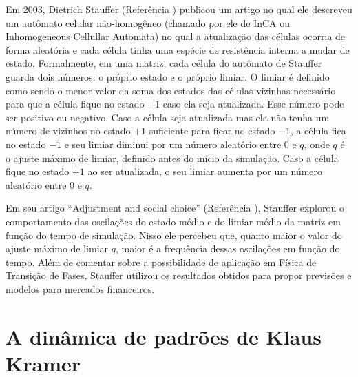 \documentclass[
	12pt,				%
	openright,			%
	twoside,			%
	a4paper,			%
	english,			%
	french,				%
	spanish,			%
	brazil				%
	]{abntex2}
\begin{document}
Em 2003, Dietrich Stauffer (Referência \cite{stauffer}) publicou um artigo no qual ele descreveu um autômato celular não-homogêneo (chamado por ele de InCA ou Inhomogeneous Cellullar Automata) no qual a atualização das células ocorria de forma aleatória e cada célula tinha uma espécie de resistência interna a mudar de estado. Formalmente, em uma matriz, cada célula do autômato de Stauffer guarda dois números: o próprio estado e o próprio limiar. O limiar é definido como sendo o menor valor da soma dos estados das células vizinhas necessário para que a célula fique no estado $+1$ caso ela seja atualizada. Esse número pode ser positivo ou negativo. Caso a célula seja atualizada mas ela não tenha um número de vizinhos no estado $+1$ suficiente para ficar no estado $+1$, a célula fica no estado $-1$ e seu limiar diminui por um número aleatório entre $0$ e $q$, onde $q$ é o ajuste máximo de limiar, definido antes do início da simulação. Caso a célula fique no estado $+1$ ao ser atualizada, o seu limiar aumenta por um número aleatório entre $0$ e $q$.

Em seu artigo ``Adjustment and social choice'' (Referência \cite{stauffer}), Stauffer explorou o comportamento das oscilações do estado médio e do limiar médio da matriz em função do tempo de simulação. Nisso ele percebeu que, quanto maior o valor do ajuste máximo de limiar $q$, maior é a frequência dessas oscilações em função do tempo. Além de comentar sobre a possibilidade de aplicação em Física de Transição de Fases, Stauffer utilizou os resultados obtidos para propor previsões e modelos para mercados financeiros.

\section*{A dinâmica de padrões de Klaus Kramer}
\end{document}
